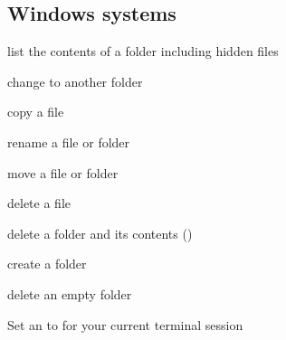 \ignorespaces 

\subsection{Windows systems}
\label{\detokenize{intro/howto:windows-systems}}\label{\detokenize{intro/howto:index-3}}\begin{description}
\sphinxAtStartPar
list the contents of a folder including hidden files

\sphinxAtStartPar
change to another folder

\sphinxAtStartPar
copy a file

\sphinxAtStartPar
rename a file or folder

\sphinxAtStartPar
move a file or folder

\sphinxAtStartPar
delete a file

\sphinxAtStartPar
delete a folder and its contents ()

\sphinxAtStartPar
create a folder

\sphinxAtStartPar
delete an empty folder

\sphinxAtStartPar
Set an {\hyperref[\detokenize{glossary:term-environment-variable}]{}}  to  for your current terminal session

\end{description}

